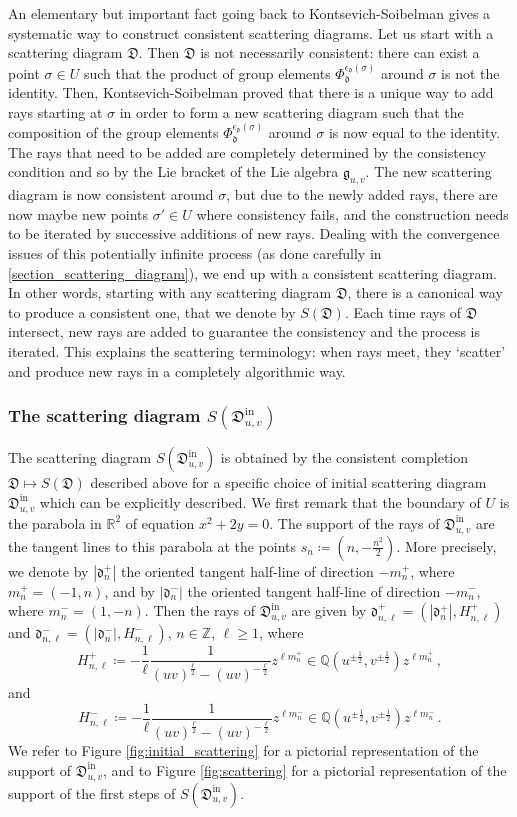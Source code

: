 \documentclass[12pt, a4paper]{amsart}
\newcommand\R{\mathbb R}
\newcommand\Q{\mathbb Q}
\newcommand\Z{\mathbb Z}
\newcommand\fd{\mathfrak d}
\newcommand\fD{\mathfrak D}
\newcommand\fg{\mathfrak g}
\newcommand\iin{\mathrm{in}}
\begin{document}
An elementary but important fact going back to Kontsevich-Soibelman \cite{MR2181810} gives a systematic way to construct consistent scattering diagrams.
Let us start with a scattering diagram 
$\fD$. Then $\fD$ is not necessarily consistent: there can exist a point $\sigma \in U$ such that the product of group elements $\Phi_\fd^{\epsilon_\fd(\sigma)}$ around $\sigma$ is not the identity. 
Then, Kontsevich-Soibelman \cite{MR2181810} proved that there is a unique way to add rays starting at $\sigma$ in order to form a new scattering diagram such that the composition of the group elements $\Phi_\fd^{\epsilon_\fd(\sigma)}$ around $\sigma$ is now equal to the identity. The rays that need to be added are completely determined by the consistency condition and so by the Lie bracket of the Lie algebra $\fg_{u,v}$.
The new scattering diagram is now consistent around $\sigma$, but due to the newly added rays, there are now maybe new points $\sigma' \in U$ where consistency fails, and the construction needs to be iterated by successive additions of new rays. Dealing with the convergence issues of this potentially infinite process (as done carefully in \cref{section_scattering_diagram}), we end up with a consistent scattering diagram. 
In other words, starting with any scattering diagram $\fD$, there is a canonical way to produce a consistent one, that we denote by $S(\fD)$. Each time rays of 
$\fD$ intersect, new rays are added to guarantee the consistency and the process is iterated. This explains the scattering terminology: when rays meet, they `scatter' and produce new rays in a completely algorithmic way.

\subsubsection{The scattering diagram $S(\fD^\iin_{u,v})$}
The scattering diagram $S(\fD^\iin_{u,v})$ is obtained by the consistent completion
$\fD \mapsto S(\fD)$ described above for a specific choice of initial scattering diagram $\fD^\iin_{u,v}$ which can be explicitly described. We first remark that the boundary of $U$ is the parabola in 
$\R^2$ of equation $x^2+2y=0$. The support of the rays of $\fD^{\iin}_{u,v}$ are the tangent lines to this parabola at the points
$s_n \coloneq (n,-\frac{n^2}{2})$. More precisely, we denote by $|\fd_n^+|$ the oriented tangent half-line of direction $-m_n^+$, where $m_n^+=(-1,n)$, 
and by $|\fd_n^-|$ the oriented tangent half-line of direction
$-m_n^-$, where $m_n^-=(1,-n)$.
Then the rays of $\fD^\iin_{u,v}$ are given by $\fd_{n,\ell}^+=(|\fd_n^+|, H_{n,\ell}^+)$
and  $\fd_{n,\ell}^-=(|\fd_n^-|, H_{n,\ell}^-)$, $n\in \Z$,
$\ell \geqslant 1$, where 
\[H_{n,\ell}^+ \coloneq - \frac{1}{\ell} \frac{1}{(uv)^{\frac{\ell}{2}}
-(uv)^{-\frac{\ell}{2}}} z^{\ell m_n^+} \in \Q(u^{\pm\frac{1}{2}}, v^{\pm\frac{1}{2}})z^{\ell m_n^+}\,,\]
and 
\[H_{n,\ell}^- \coloneq - \frac{1}{\ell} \frac{1}{(uv)^{\frac{\ell}{2}}
-(uv)^{-\frac{\ell}{2}}} z^{\ell m_n^-}\in \Q(u^{\pm\frac{1}{2}}, v^{\pm\frac{1}{2}})z^{\ell m_n^-}\,.\]
We refer to Figure \ref{fig:initial_scattering} for a pictorial representation of the support of $\fD^\iin_{u,v}$, and to Figure 
\ref{fig:scattering} for a pictorial representation of the support of the first steps of $S(\fD^\iin_{u,v})$.
\end{document}
